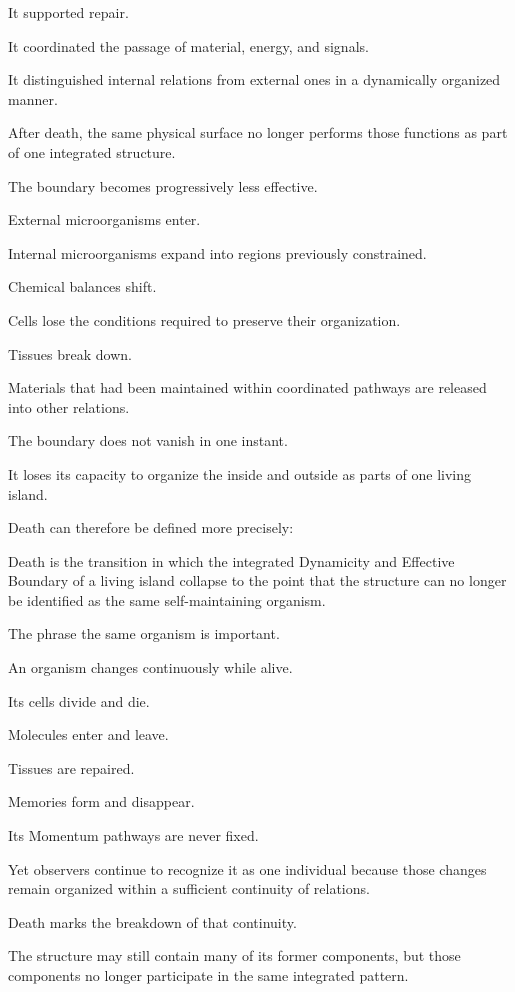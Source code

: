It supported repair.

It coordinated the passage of material, energy, and signals.

It distinguished internal relations from external ones in a dynamically organized manner.

After death, the same physical surface no longer performs those functions as part of one integrated structure.

The boundary becomes progressively less effective.

External microorganisms enter.

Internal microorganisms expand into regions previously constrained.

Chemical balances shift.

Cells lose the conditions required to preserve their organization.

Tissues break down.

Materials that had been maintained within coordinated pathways are released into other relations.

The boundary does not vanish in one instant.

It loses its capacity to organize the inside and outside as parts of one living island.

Death can therefore be defined more precisely:

Death is the transition in which the integrated Dynamicity and Effective Boundary of a living island collapse to the point that the structure can no longer be identified as the same self-maintaining organism.

The phrase the same organism is important.

An organism changes continuously while alive.

Its cells divide and die.

Molecules enter and leave.

Tissues are repaired.

Memories form and disappear.

Its Momentum pathways are never fixed.

Yet observers continue to recognize it as one individual because those changes remain organized within a sufficient continuity of relations.

Death marks the breakdown of that continuity.

The structure may still contain many of its former components, but those components no longer participate in the same integrated pattern.

